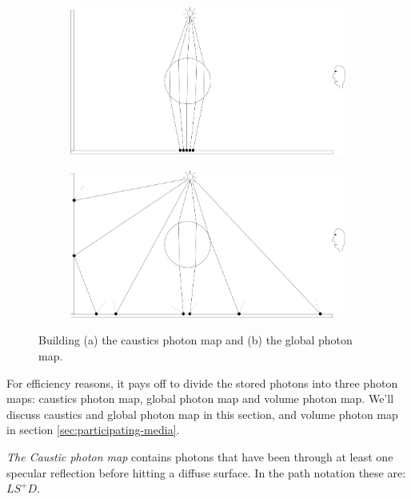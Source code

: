 \begin{figure}
\begin{center}
	\begin{subfigure}[b]{.48\textwidth}
		\includegraphics[width=1.\textwidth]{graphics/pm/pm-9-1}
		\caption{}
	\end{subfigure}
	\begin{subfigure}[b]{.48\textwidth}
		\includegraphics[width=1.\textwidth]{graphics/pm/pm-9-2}
		\caption{}
	\end{subfigure}
\end{center}
\caption{Building (a) the caustics photon map and (b) the global photon map.}
\label{f:photon-maps}
\end{figure}

For efficiency reasons, it pays off to divide the stored photons into three photon maps: caustics photon map, global photon map and volume photon map. We'll discuss caustics and global photon map in this section, and volume photon map in section \ref{sec:participating-media}.

\textit{The Caustic photon map} contains photons that have been through at least one specular reflection before hitting a diffuse surface. In the path notation these are: $LS^{+}D$. 

